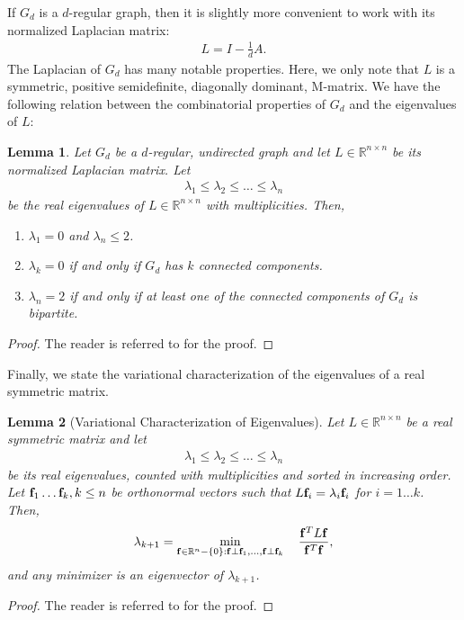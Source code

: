 \documentclass{amsart}
\newtheorem{lemma}{Lemma}
\theoremstyle{definition}
\theoremstyle{remark}
\numberwithin{equation}{section}
\def\bof{{\bf f}}
\def\R{\mathbb{R}}
\begin{document}
If $G_d$ is a $d$-regular graph, then it is slightly more convenient to work with its normalized Laplacian matrix:
\begin{align*}
L = I-\frac{1}{d}A.
\end{align*}
The Laplacian of $G_d$ has many notable properties.  Here, we only note that $L$ is a symmetric, positive semidefinite, diagonally dominant, M-matrix. We have the following relation between the combinatorial properties of $G_d$ and the eigenvalues of $L$:
\begin{lemma} \label{lem:eigL}
Let $G_d$ be a $d$-regular, undirected graph and let $L \in \R^{n \times n}$ be its normalized Laplacian matrix. Let 
\begin{align*}
\lambda_1 \leq \lambda_2 \leq \ldots \leq \lambda_n
\end{align*}
be the real eigenvalues of $L \in \R^{n \times n}$ with multiplicities. Then, 
\begin{enumerate}
\item $\lambda_1 = 0$ and $\lambda_n \leq 2$.
\item $\lambda_k = 0$ if and only if $G_d$ has $k$ connected components.
\item $\lambda_n = 2$ if and only if at least one of the connected components of $G_d$ is bipartite.
\end{enumerate}
\end{lemma}
\begin{proof}
The reader is referred to \cite{Dies} for the proof.
\end{proof}
Finally, we state the variational characterization of the eigenvalues of a real symmetric matrix. 
\begin{lemma}[Variational Characterization of Eigenvalues] \label{lem:variational}
Let $L \in \R^{n \times n}$ be a real symmetric matrix and let 
\begin{align*}
\lambda_1 \leq \lambda_2 \leq \ldots \leq \lambda_n
\end{align*}
be its real eigenvalues, counted with multiplicities and sorted in increasing order. Let $\bof_1 \ldots \bof_k, k\leq n$ be orthonormal vectors such that $L\bof_i = \lambda_i \bof_i$ for $i = 1\ldots k$. Then,
\begin{align}
\lambda_{k+1} =\min_{\bof \in \R^{n} - \{0\}: \bof \bot \bof_1, \ldots, \bof \perp \bof_k} \quad \frac{\bof^T L \bof}{\bof^T \bof},
\end{align}
and any minimizer is an eigenvector of $\lambda_{k+1}$.
\end{lemma}
\begin{proof}
The reader is referred to \cite{Hor99} for the proof.
\end{proof}
\end{document}
